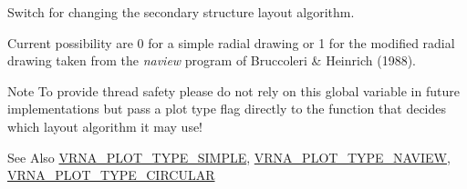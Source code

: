 Switch for changing the secondary structure layout algorithm. 

Current possibility are 0 for a simple radial drawing or 1 for the modified radial drawing taken from the {\itshape naview} program of Bruccoleri \& Heinrich (1988).

\begin{DoxyNote}{Note}
To provide thread safety please do not rely on this global variable in future implementations but pass a plot type flag directly to the function that decides which layout algorithm it may use!
\end{DoxyNote}
\begin{DoxySeeAlso}{See Also}
\hyperlink{group__plotting__utils_gae6d17b9f0a53cf5205a9181e0f8422e9}{V\-R\-N\-A\-\_\-\-P\-L\-O\-T\-\_\-\-T\-Y\-P\-E\-\_\-\-S\-I\-M\-P\-L\-E}, \hyperlink{group__plotting__utils_ga94d4c863ecac2f220f76658afb92f964}{V\-R\-N\-A\-\_\-\-P\-L\-O\-T\-\_\-\-T\-Y\-P\-E\-\_\-\-N\-A\-V\-I\-E\-W}, \hyperlink{group__plotting__utils_ga8c9eac631348da92136c8363ecdd9fb9}{V\-R\-N\-A\-\_\-\-P\-L\-O\-T\-\_\-\-T\-Y\-P\-E\-\_\-\-C\-I\-R\-C\-U\-L\-A\-R} 
\end{DoxySeeAlso}
